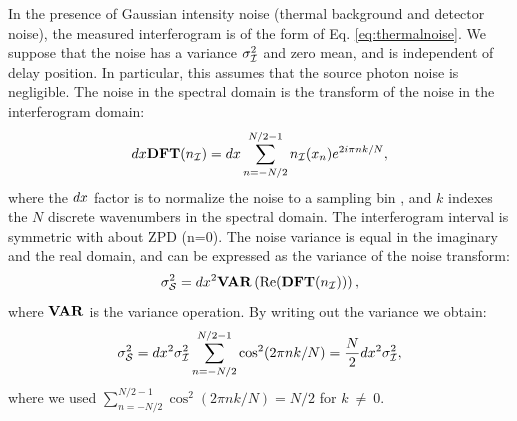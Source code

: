 In the presence of Gaussian intensity noise (thermal background and detector noise), the measured interferogram is of the form of Eq. \ref{eq:thermalnoise}. We suppose that the noise has a variance $\sigma_{\mathcal{I}}^2$ and zero mean, and is independent of delay position.  In particular, this assumes that the source photon noise is negligible.
The noise in the spectral domain is the transform of the noise in the interferogram domain:
\begin{equation}
dx\mathbf{DFT}(n_{\mathcal{I}}) =  dx\sum_{n=-N/2}^{N/2-1}n_{\mathcal{I}}(x_n)e^{2i\pi n k/N},
\end{equation}
where the $dx$ factor is to normalize the noise to a sampling bin \citep{Press:1992vya}, 
and $k$ indexes the $N$ discrete wavenumbers in the spectral domain.
The interferogram interval is symmetric with about ZPD (n=0). The noise variance is equal in the imaginary and the real domain, and can be expressed as the variance of the noise transform:
\begin{equation}
\sigma_\mathcal{S}^2 = dx^2\mathbf{VAR}\left(\textrm{Re}(\mathbf{DFT}(n_{\mathcal{I}}))\right),
\end{equation}
where $\mathbf{VAR}$ is the variance operation. By writing out the variance we obtain:
\begin{equation}
\sigma_\mathcal{S}^2 = dx^2\sigma_{\mathcal{I}}^2\sum_{n=-N/2}^{N/2-1}\cos^2(2\pi nk/N) =\frac{N}{2}dx^2\sigma_{\mathcal{I}}^2 ,
\end{equation}
where we used $\sum_{n=-N/2}^{N/2-1}\cos^2(2\pi nk/N) = N/2$ for $k~\neq~0$. 

